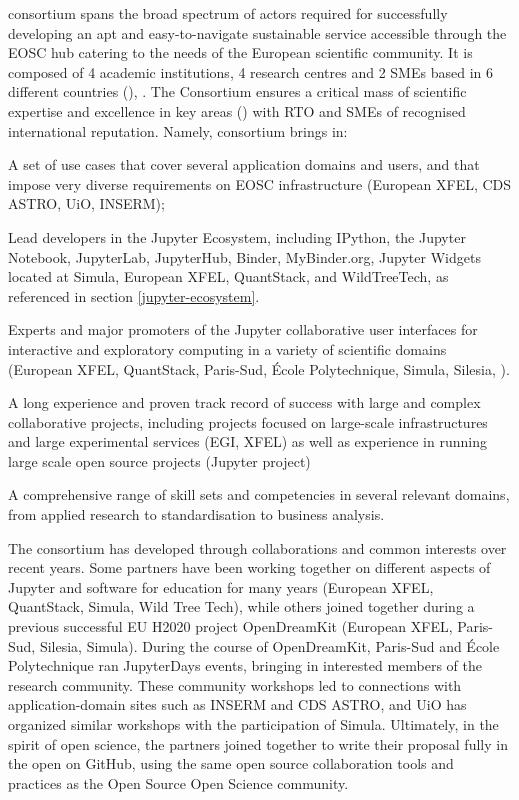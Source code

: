 {\TheProject consortium spans the broad spectrum of actors required 
for successfully developing an apt and easy-to-navigate sustainable service 
accessible through the EOSC hub catering to the needs of the European 
scientific community. It is composed of 4 academic institutions, 4 research 
centres and 2 SMEs based in 6 different countries (), . 
The Consortium ensures a critical mass of scientific expertise and excellence 
in key areas () with RTO and SMEs of recognised
 international reputation. Namely, \TheProject consortium brings in:
\begin{compactitem}
\item A set of use cases that cover several application domains and users, and that impose very diverse requirements on EOSC infrastructure (European XFEL, CDS ASTRO, UiO, INSERM);
\item Lead developers in the Jupyter Ecosystem, including IPython, the Jupyter Notebook, JupyterLab, JupyterHub, Binder, MyBinder.org, Jupyter Widgets located at Simula, European XFEL, QuantStack, and WildTreeTech,
as referenced in section \ref{jupyter-ecosystem}.
\item Experts and major promoters of the Jupyter collaborative user interfaces for interactive and exploratory computing in a variety of scientific domains (European XFEL, QuantStack, Paris-Sud, \'Ecole Polytechnique, Simula, Silesia, ).
\item A long experience and proven track record of success with large and complex collaborative projects, including projects focused on large-scale infrastructures and large experimental services (EGI, XFEL) as well as experience in running large scale open source projects (Jupyter project)
\item A comprehensive range of skill sets and competencies in several relevant domains, from applied research to standardisation to business
analysis.
\end{compactitem}

The consortium has developed through collaborations and common interests over recent years.
Some partners have been working together on different aspects of Jupyter
and software for education for many years (European XFEL, QuantStack, Simula, Wild Tree Tech),
while others joined together during a previous successful EU H2020 project OpenDreamKit (European XFEL, Paris-Sud, Silesia, Simula).
During the course of OpenDreamKit, Paris-Sud and \'Ecole Polytechnique
ran JupyterDays events, bringing in interested members of the research community.
These community workshops led to connections with application-domain sites such as INSERM and CDS ASTRO,
and UiO has organized similar workshops with the participation of Simula.
Ultimately, in the spirit of open science,
the partners joined together to write their proposal fully in the open on GitHub,
using the same open source collaboration tools and practices
as the Open Source Open Science community.

}
